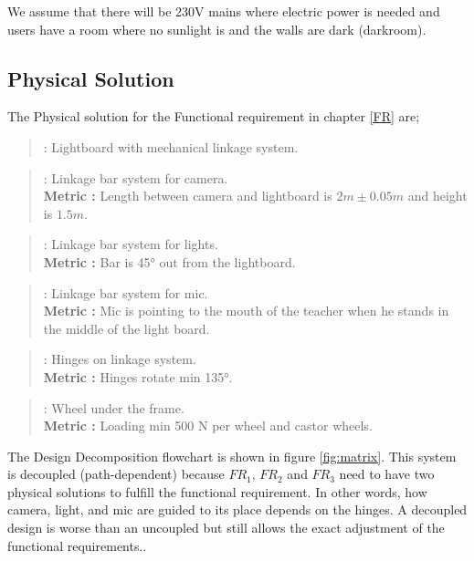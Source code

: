 \documentclass[a4paper]{jpconf}
\begin{document}
	We assume that there will be 230V mains where electric power is needed and users have a room where no sunlight is and the walls are dark (darkroom).     %
	
	\subsection{Physical Solution}\label{PS}
	The Physical solution for the Functional requirement in chapter \ref{FR} are;
	\begin{quote} 
		\textbf{} : Lightboard with mechanical linkage system.
	\end{quote}
	
	\begin{quote} 
		\textbf{} : Linkage bar system for camera. \\ 
		\textbf{Metric :} Length between camera and lightboard is $2 m \pm 0.05 m$ and height is $1.5 m$.
	\end{quote}
	
	\begin{quote} 
		\textbf{} : Linkage bar system for lights.
		\\ \textbf{Metric :} Bar is 45° out from the lightboard.
	\end{quote}
	
	\begin{quote} 
		\textbf{} : Linkage bar system for mic.
		\\ \textbf{Metric :} Mic is pointing to the mouth of the teacher when he stands in the middle of the light board.
	\end{quote}
	
	\begin{quote} 
		\textbf{} : Hinges on linkage system.
		\\ \textbf{Metric :} Hinges rotate min 135°.
	\end{quote}
	
	\begin{quote} 
		\textbf{} : Wheel under the frame.
		\\ \textbf{Metric :} Loading min 500 N per wheel and castor wheels.
	\end{quote}
	
	The Design Decomposition flowchart is shown in figure \ref{fig:matrix}.
	This system is decoupled (path-dependent) because $FR_1$, $FR_2$ and $FR_3$ need to have two physical solutions to fulfill the functional requirement.
	In other words, how camera, light, and mic are guided to its place depends on the hinges.
	A decoupled design is worse than an uncoupled but still allows the exact adjustment of the functional requirements.\cite{system_design}.
	
\end{document}
